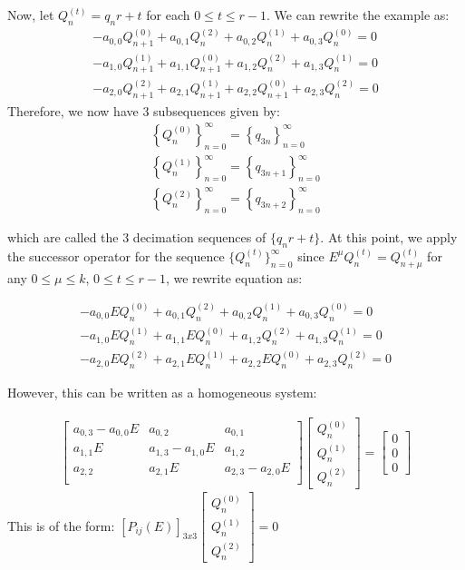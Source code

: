 \documentclass[a4paper]{article}
\theoremstyle{definition}
\begin{document}
Now, let $Q_n^{(t)}=q_nr+t$ for each $0 \le t \le r-1$. We can rewrite the example as:
\begin{align*}
-a_{0,0}Q_{n+1}^{(0)}+a_{0,1}Q_{n}^{(2)}
+a_{0,2}Q_{n}^{(1)}+a_{0,3}Q_{n}^{(0)} = 0 \\
-a_{1,0}Q_{n+1}^{(1)}+a_{1,1}Q_{n+1}^{(0)}
+a_{1,2}Q_{n}^{(2)}+a_{1,3}Q_{n}^{(1)} = 0 \\
-a_{2,0}Q_{n+1}^{(2)}+a_{2,1}Q_{n+1}^{(1)}
+a_{2,2}Q_{n+1}^{(0)}+a_{2,3}Q_{n}^{(2)} = 0
\end{align*}
Therefore, we now have 3 subsequences given by:
\begin{align*}
\left\{Q_n^{(0)}\right\}_{n=0}^{\infty}
=\left\{q_{3n}\right\}_{n=0}^{\infty}   \\
\left\{Q_n^{(1)}\right\}_{n=0}^{\infty}
=\left\{q_{3n+1}\right\}_{n=0}^{\infty} \\
\left\{Q_n^{(2)}\right\}_{n=0}^{\infty}
=\left\{q_{3n+2}\right\}_{n=0}^{\infty}
\end{align*}

which are called the $3$ decimation sequences of $\{q_nr+t\}$. At this point, we apply the successor
operator for the sequence $\{Q_n^{(t)}\}_{n=0}^{\infty}$ since $E^{\mu}Q_{n}^{(t)}=Q_{n+\mu}^{(t)}$ for
any $0 \le \mu \le k$, $0 \le t \le r-1$, we rewrite equation as:

\begin{align*}
-a_{0,0}EQ_{n}^{(0)}+a_{0,1}Q_{n}^{(2)}
+a_{0,2}Q_{n}^{(1)}+a_{0,3}Q_{n}^{(0)} = 0 \\
-a_{1,0}EQ_{n}^{(1)}+a_{1,1}EQ_{n}^{(0)}
+a_{1,2}Q_{n}^{(2)}+a_{1,3}Q_{n}^{(1)} = 0 \\
-a_{2,0}EQ_{n}^{(2)}+a_{2,1}EQ_{n}^{(1)}
+a_{2,2}EQ_{n}^{(0)}+a_{2,3}Q_{n}^{(2)} = 0
\end{align*}

However, this can be written as a homogeneous system:

\begin{align*}
\begin{bmatrix}
    a_{0,3}-a_{0,0}E & a_{0,2}          & a_{0,1}          \\
    a_{1,1}E         & a_{1,3}-a_{1,0}E & a_{1,2}          \\
    a_{2,2}          & a_{2,1}E         & a_{2,3}-a_{2,0}E \\
\end{bmatrix}
\begin{bmatrix}
    Q_{n}^{(0)} \\
    Q_{n}^{(1)} \\
    Q_{n}^{(2)}
\end{bmatrix}
=
\begin{bmatrix}
    0 \\
    0 \\
    0
\end{bmatrix}
\end{align*}
This is of the form:
$
[P_{ij}(E)]_{3 x 3}
\begin{bmatrix}
    Q_{n}^{(0)} \\
    Q_{n}^{(1)} \\
    Q_{n}^{(2)}
\end{bmatrix}
=0
$
\end{document}
